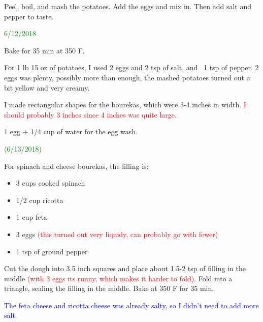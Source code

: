 \documentclass[11pt]{article}
\begin{document}
Peel, boil, and mash the potatoes.  Add the eggs and mix in.  Then add salt and pepper to taste.

\textcolor{green}{6/12/2018}

Bake for 35 min at 350 F.

For 1 lb 15 oz of potatoes, I used 2 eggs and 2 tsp of salt, and ~1 tsp of pepper.  2 eggs was plenty, possibly more than enough, the mashed potatoes turned out a bit yellow and very creamy.

I made rectangular shapes for the bourekas, which were 3-4 inches in width.  \textcolor{red}{I should probably 3 inches since 4 inches was quite large.}

1 egg + 1/4 cup of water for the egg wash.

\textcolor{green}{(6/13/2018)}

For spinach and cheese bourekas, the filling is:
\begin{itemize}
\item 3 cups cooked spinach
\item 1/2 cup ricotta
\item 1 cup feta
\item 3 eggs \textcolor{red}{(this turned out very liquidy, can probably go with fewer)}
\item 1 tsp of ground pepper
\end{itemize}

Cut the dough into 3.5 inch squares and place about 1.5-2 tsp of filling in the middle \textcolor{red}{(with 3 eggs its runny, which makes it harder to fold)}.  Fold into a triangle, sealing the filling in the middle.  Bake at 350 F for 35 min.

\textcolor{blue}{The feta cheese and ricotta cheese was already salty, so I didn't need to add more salt.}
\end{document}
